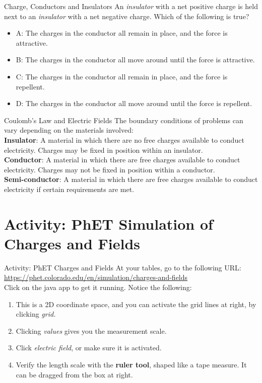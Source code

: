 \documentclass{beamer}
\begin{document}
\begin{frame}{Charge, Conductors and Insulators}
An \textit{insulator} with a net positive charge is held next to an \textit{insulator} with a net negative charge.  Which of the following is true?
\begin{itemize}
\item A: The charges in the conductor all remain in place, and the force is attractive.
\item B: The charges in the conductor all move around until the force is attractive.
\item C: The charges in the conductor all remain in place, and the force is repellent.
\item D: The charges in the conductor all move around until the force is repellent.
\end{itemize}
\end{frame}

\begin{frame}{Coulomb’s Law and Electric Fields}
The boundary conditions of problems can vary depending on the materials involved: \\ \vspace{0.5cm}
\textbf{Insulator}: A material in which there are no free charges available to conduct electricity.  Charges may be fixed in position within an insulator. \\
\textbf{Conductor}: A material in which there are free charges available to conduct electricity.  Charges may not be fixed in position within a conductor. \\
\textbf{Semi-conductor}: A material in which there are free charges available to conduct electricity if certain requirements are met.
\end{frame}

\section{Activity: PhET Simulation of Charges and Fields}

\begin{frame}{Activity: PhET Charges and Fields}
At your tables, go to the following URL: \\ \vspace{0.2cm}
\url{https://phet.colorado.edu/en/simulation/charges-and-fields} \\ \vspace{0.2cm}
Click on the java app to get it running.  Notice the following:
\begin{enumerate}
\item This is a 2D coordinate space, and you can activate the grid lines at right, by clicking \textit{grid.}
\item Clicking \textit{values} gives you the measurement scale.
\item Click \textit{electric field}, or make sure it is activated.
\item Verify the length scale with the \textbf{ruler tool}, shaped like a tape measure.  It can be dragged from the box at right.
\end{enumerate}
\end{frame}
\end{document}

